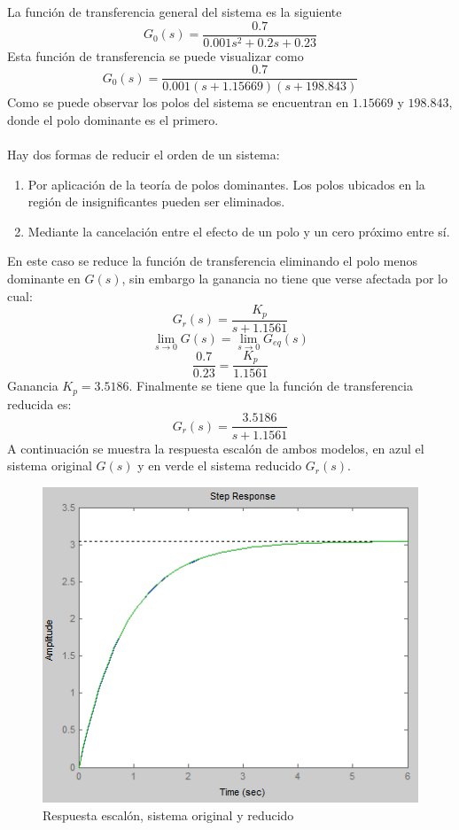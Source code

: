 \documentclass[twocolumn]{IEEEtran}
\begin{document}
La función de transferencia general del sistema  es la siguiente
\begin{equation}
 G_0(s)=\frac{0.7}{0.001s^2+0.2s+0.23}
\end{equation}
\noindent
Esta función de transferencia se puede visualizar como
\begin{equation}
 G_0(s)=\frac{0.7}{0.001(s+1.15669)(s+198.843)}
\end{equation}
\noindent
Como se puede observar los polos del sistema se encuentran en $1.15669$ y $198.843$, donde el polo dominante es el primero.\\\\
Hay dos formas de reducir el orden de un sistema: 
\begin{enumerate}
 \item Por aplicación de la teoría de polos dominantes. Los  polos ubicados en la región de insignificantes pueden ser eliminados.
 \item Mediante la cancelación entre el efecto de un polo y un  cero próximo entre sí.
\end{enumerate}
\noindent
En este caso se reduce la función de transferencia eliminando el polo menos dominante en $G(s)$, sin embargo la ganancia no tiene que verse afectada por lo cual:
\begin{equation}
 G_r(s)=\frac{K_p}{s+1.1561}
\end{equation}
\begin{equation}
 \mathop {\lim }\limits_{s \to 0} G(s) = \mathop {\lim }\limits_{s \to 0} G_{eq} (s)
\end{equation}
$$\frac{0.7}{0.23}=\frac{K_p}{1.1561}$$
\noindent
Ganancia $K_p=3.5186$. Finalmente se tiene que la función de transferencia reducida es:
\begin{equation}
 G_r(s)=\frac{3.5186}{s+1.1561}
\label{ecu9}
\end{equation}
\noindent
A continuación se muestra la respuesta escalón de ambos modelos, en azul el sistema original $G(s)$ y en verde el sistema reducido $G_r(s)$. 
\begin{figure}[H]
	\centering
		\includegraphics[scale=0.5]{figure11.png}
	\caption{Respuesta escalón, sistema original y reducido}
	\label{fig11}
\end{figure}
\end{document}

